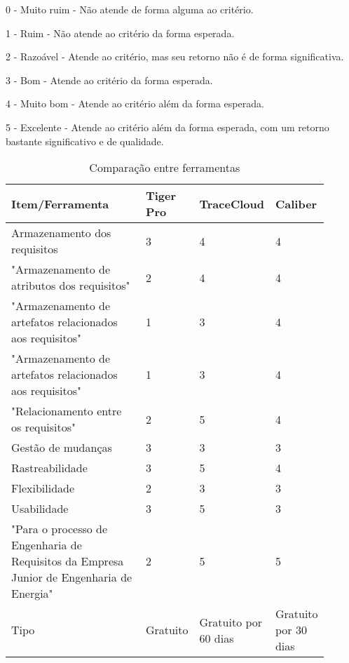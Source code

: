 0 - Muito ruim - Não atende de forma alguma ao critério.

1 - Ruim - Não atende ao critério da forma esperada.

2 - Razoável - Atende ao critério, mas seu retorno não é de forma significativa.

3 - Bom - Atende ao critério da forma esperada.

4 - Muito bom - Atende ao critério além da forma esperada.

5 - Excelente - Atende ao critério além da forma esperada, com um retorno bastante significativo e de qualidade.

\begin{table*}[!h]
\caption{Comparação entre ferramentas}
\label{fig:quadro}
\begin{tabular}{p{0.45\linewidth}p{0.15\linewidth}p{0.15\linewidth}p{0.15\linewidth}}
  \hline
  Item/Ferramenta & Tiger Pro & TraceCloud & Caliber \\
  \hline			
  Armazenamento dos requisitos & 3 & 4 & 4\\
  \hline
  "Armazenamento de atributos dos requisitos"	& 2 & 4 & 4\\
  \hline
    "Armazenamento de artefatos relacionados aos requisitos"	& 1 & 3 & 4\\
  \hline
      "Armazenamento de artefatos relacionados aos requisitos"	& 1 & 3 & 4\\
  \hline
       "Relacionamento entre os requisitos"	& 2 & 5 & 4\\
  \hline
  Gestão de mudanças	&3	&3&	3\\
  \hline
  Rastreabilidade	&3&	5	&4\\
  \hline
  Flexibilidade	&2&	3	&3\\
  \hline
  Usabilidade 	&3	&5	&3\\
  \hline
  "Para o processo de Engenharia de Requisitos da Empresa Junior de Engenharia de Energia"	&2	&5	&5\\
  \hline
    Tipo &Gratuito	&Gratuito por 60 dias	&Gratuito por 30 dias\\
    
  \hline
  \end{tabular}
\end{table*}




